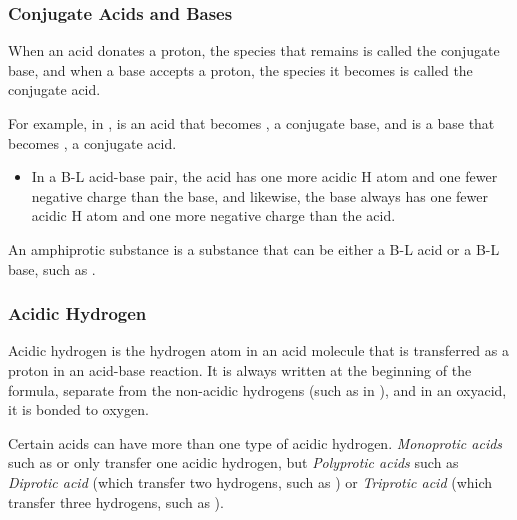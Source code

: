 \subsubsection{Conjugate Acids and Bases}

\begin{defn}
When an acid donates a proton, the species that remains is called the conjugate base, and when a base accepts a proton, the species it becomes is called the conjugate acid.
\end{defn}

\noindent
{}

\begin{example}
For example, in ,  is an acid that becomes , a conjugate base, and  is a base that becomes , a conjugate acid.
\end{example}

\begin{itemize}
\item In a B-L acid-base pair, the acid has one more acidic H atom and one fewer negative charge than the base, and likewise, the base always has one fewer acidic H atom and one more negative charge than the acid.
\end{itemize}

\begin{defn}
An amphiprotic substance is a substance that can be either a B-L acid or a B-L base, such as .
\end{defn}

\subsubsection{Acidic Hydrogen}

\begin{defn}
Acidic hydrogen is the hydrogen atom in an acid molecule that is transferred as a proton in an acid-base reaction. It is always written at the beginning of the formula, separate from the non-acidic hydrogens (such as in ), and in an oxyacid, it is bonded to oxygen.
\end{defn}

\noindent
Certain acids can have more than one type of acidic hydrogen. \textit{Monoprotic acids} such as  or  only transfer one acidic hydrogen, but \textit{Polyprotic acids} such as \textit{Diprotic acid} (which transfer two hydrogens, such as ) or \textit{Triprotic acid} (which transfer three hydrogens, such as ). \\

